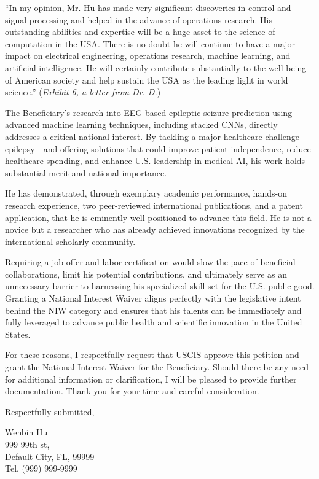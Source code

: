 \documentclass{article}
\begin{document}
“In my opinion, Mr. Hu has made very significant discoveries in control and signal processing and helped in the advance of operations research. His outstanding abilities and expertise will be a huge asset to the science of computation in the USA. There is no doubt he will continue to have a major impact on electrical engineering, operations research, machine learning, and artificial intelligence. He will certainly contribute substantially to the well-being of American society and help sustain the USA as the leading light in world science.” ({\it Exhibit 6, a letter from Dr. D.}) 

The Beneficiary’s research into EEG-based epileptic seizure prediction using advanced machine learning techniques, including stacked CNNs, directly addresses a critical national interest. By tackling a major healthcare challenge—epilepsy—and offering solutions that could improve patient independence, reduce healthcare spending, and enhance U.S. leadership in medical AI, his work holds substantial merit and national importance.

He has demonstrated, through exemplary academic performance, hands-on research experience, two peer-reviewed international publications, and a patent application, that he is eminently well-positioned to advance this field. He is not a novice but a researcher who has already achieved innovations recognized by the international scholarly community.

Requiring a job offer and labor certification would slow the pace of beneficial collaborations, limit his potential contributions, and ultimately serve as an unnecessary barrier to harnessing his specialized skill set for the U.S. public good. Granting a National Interest Waiver aligns perfectly with the legislative intent behind the NIW category and ensures that his talents can be immediately and fully leveraged to advance public health and scientific innovation in the United States.

For these reasons, I respectfully request that USCIS approve this petition and grant the National Interest Waiver for the Beneficiary. Should there be any need for additional information or clarification, I will be pleased to provide further documentation.
Thank you for your time and careful consideration.

Respectfully submitted,

\vspace{5\baselineskip}

Wenbin Hu\\
999 99th st,\\
Default City, FL, 99999\\
Tel. (999) 999-9999
\end{document}
